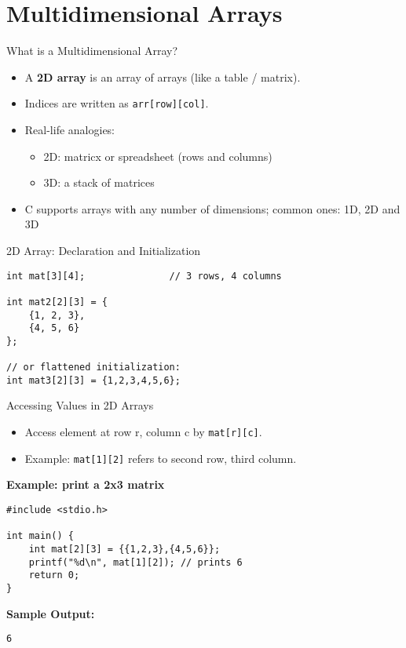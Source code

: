 \documentclass[12pt, aspectratio=169]{beamer}
\begin{document}
    \section{Multidimensional Arrays}


    \begin{frame}{What is a Multidimensional Array?}
        \begin{itemize}
            \item A \textbf{2D array} is an array of arrays (like a table / matrix).
            \item Indices are written as \texttt{arr[row][col]}.
            \item Real-life analogies:
                \begin{itemize}
                    \item 2D: matricx or spreadsheet (rows and columns)
                    \item 3D: a stack of matrices
                \end{itemize}
            \item C supports arrays with any number of dimensions; common ones: 1D, 2D and 3D
        \end{itemize}
    \end{frame}

    \begin{frame}[fragile]{2D Array: Declaration and Initialization}
        \begin{verbatim}
int mat[3][4];               // 3 rows, 4 columns

int mat2[2][3] = {
    {1, 2, 3},
    {4, 5, 6}
};

// or flattened initialization:
int mat3[2][3] = {1,2,3,4,5,6};
        \end{verbatim}
    \end{frame}

    \begin{frame}[fragile]{Accessing Values in 2D Arrays}
        \begin{itemize}
            \item Access element at row r, column c by \texttt{mat[r][c]}.
            \item Example: \texttt{mat[1][2]} refers to second row, third column.
        \end{itemize}

        \textbf{Example: print a 2x3 matrix}
        \begin{verbatim}
#include <stdio.h>

int main() {
    int mat[2][3] = {{1,2,3},{4,5,6}};
    printf("%d\n", mat[1][2]); // prints 6
    return 0;
}
        \end{verbatim}

        \textbf{Sample Output:}
        \begin{verbatim}
6
        \end{verbatim}
    \end{frame}
\end{document}
